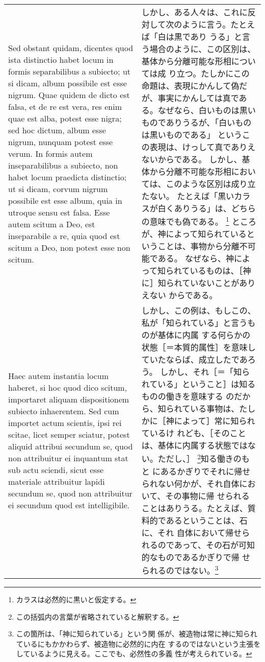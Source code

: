 \documentclass[10pt]{jsarticle} %
\begin{document}
\begin{longtable}{p{21em}p{21em}}
Sed obstant quidam, dicentes quod ista distinctio habet locum in
formis separabilibus a subiecto; ut si dicam, album possibile est esse
nigrum. Quae quidem de dicto est falsa, et de re est vera, res enim
quae est alba, potest esse nigra; sed hoc dictum, album esse nigrum,
nunquam potest esse verum. In formis autem inseparabilibus a subiecto,
non habet locum praedicta distinctio; ut si dicam, corvum nigrum
possibile est esse album, quia in utroque sensu est falsa. Esse autem
scitum a Deo, est inseparabile a re, quia quod est scitum a Deo, non
potest esse non scitum.


&

しかし、ある人々は、これに反対して次のように言う。たとえば「白は黒であり
うる」と言う場合のように、この区別は、基体から分離可能な形相については成
り立つ。たしかにこの命題は、表現にかんして偽だが、事実にかんしては真であ
る。なぜなら、白いものは黒いものでありうるが、「白いものは黒いものである」
というこの表現は、けっして真でありえないからである。
しかし、基体から分離不可能な形相においては、このような区別は成り立たない。
たとえば「黒いカラスが白くありうる」は、どちらの意味でも偽である。
 \footnote{カラスは必然的に黒いと仮定する。}
ところが、神によって知られているということは、事物から分離不可能である。
なぜなら、神によって知られているものは、［神に］知られていないことがありえない
からである。



\\


Haec autem instantia locum haberet, si hoc
quod dico scitum, importaret aliquam dispositionem subiecto
inhaerentem. Sed cum importet actum scientis, ipsi rei scitae, licet
semper sciatur, potest aliquid attribui secundum se, quod non
attribuitur ei inquantum stat sub actu sciendi, sicut esse materiale
attribuitur lapidi secundum se, quod non attribuitur ei secundum quod
est intelligibile.


&

しかし、この例は、もしこの、私が「知られている」と言うものが基体に内属
する何らかの状態［＝本質的属性］を意味していたならば、成立したであろう。
しかし、それ［＝「知られている」ということ］は知るものの働きを意味する
のだから、知られている事物は、たしかに［神によって］常に知られているけ
れども、［そのことは、基体に内属する状態ではない。ただし、］
\footnote{この括弧内の言葉が省略されていると解釈する。}知る働きのもと
にあるかぎりでそれに帰せられない何かが、それ自体において、その事物に帰
せられることはありうる。たとえば、質料的であるということは、石に、それ
自体において帰せられるのであって、その石が可知的なものであるかぎりで帰
せられるのではない。\footnote{この箇所は、「神に知られている」という関
係が、被造物は常に神に知られているにもかかわらず、被造物に必然的に内在
するのではないという主張をしているように見える。ここでも、必然性の多義
性が考えられている。}


\\
\end{longtable}
\newpage
\end{document}
